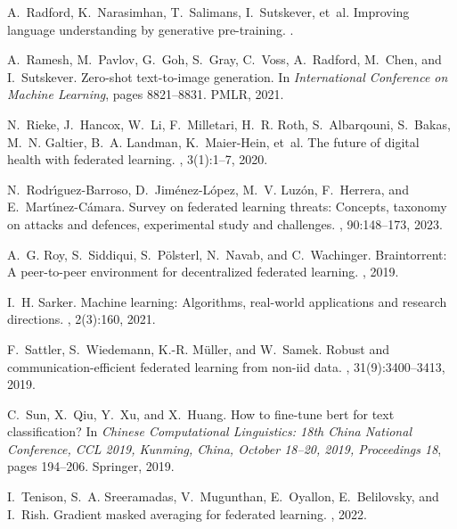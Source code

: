 \documentclass[11pt]{article}
\begin{document}
\begin{thebibliography}{10}
A.~Radford, K.~Narasimhan, T.~Salimans, I.~Sutskever, et~al.
\newblock Improving language understanding by generative pre-training.
.

A.~Ramesh, M.~Pavlov, G.~Goh, S.~Gray, C.~Voss, A.~Radford, M.~Chen, and
  I.~Sutskever.
\newblock Zero-shot text-to-image generation.
\newblock In {\em International Conference on Machine Learning}, pages
  8821--8831. PMLR, 2021.

N.~Rieke, J.~Hancox, W.~Li, F.~Milletari, H.~R. Roth, S.~Albarqouni, S.~Bakas,
  M.~N. Galtier, B.~A. Landman, K.~Maier-Hein, et~al.
\newblock The future of digital health with federated learning.
, 3(1):1--7, 2020.

N.~Rodr{\'\i}guez-Barroso, D.~Jim{\'e}nez-L{\'o}pez, M.~V. Luz{\'o}n,
  F.~Herrera, and E.~Mart{\'\i}nez-C{\'a}mara.
\newblock Survey on federated learning threats: Concepts, taxonomy on attacks
  and defences, experimental study and challenges.
, 90:148--173, 2023.

A.~G. Roy, S.~Siddiqui, S.~P{\"o}lsterl, N.~Navab, and C.~Wachinger.
\newblock Braintorrent: A peer-to-peer environment for decentralized federated
  learning.
, 2019.

I.~H. Sarker.
\newblock Machine learning: Algorithms, real-world applications and research
  directions.
, 2(3):160, 2021.

F.~Sattler, S.~Wiedemann, K.-R. M{\"u}ller, and W.~Samek.
\newblock Robust and communication-efficient federated learning from non-iid
  data.
,
  31(9):3400--3413, 2019.

C.~Sun, X.~Qiu, Y.~Xu, and X.~Huang.
\newblock How to fine-tune bert for text classification?
\newblock In {\em Chinese Computational Linguistics: 18th China National
  Conference, CCL 2019, Kunming, China, October 18--20, 2019, Proceedings 18},
  pages 194--206. Springer, 2019.

I.~Tenison, S.~A. Sreeramadas, V.~Mugunthan, E.~Oyallon, E.~Belilovsky, and
  I.~Rish.
\newblock Gradient masked averaging for federated learning.
, 2022.


\end{thebibliography}
\end{document}
